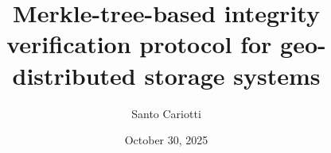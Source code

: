 \documentclass{beamer}
\title{Merkle-tree-based integrity verification protocol for geo-distributed storage
systems}
\author{Santo Cariotti}
\institute{Alma Mater Studiorum\\ Università di Bologna}
\date{October 30, 2025}
\begin{document}
\frame{\titlepage}






\end{document}
